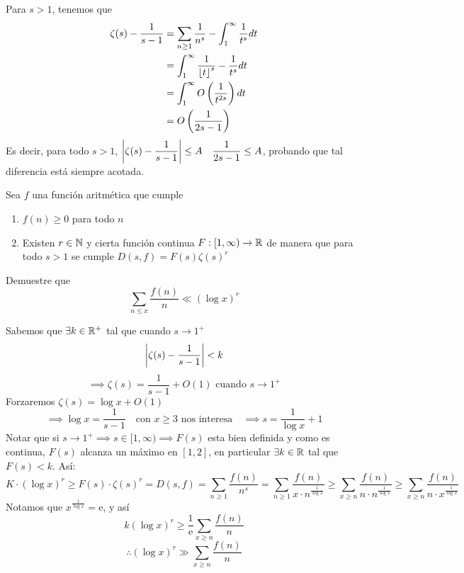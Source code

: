 \begin{sol}
    Para $s>1$, tenemos que
    \begin{align*}
        \zeta(s) - \dfrac{1}{s-1} &= \sum_{n \geq 1} \dfrac{1}{n^s} - \int_1^\infty \dfrac{1}{t^s} dt\\
        &= \int_1^\infty \dfrac{1}{\left\lfloor t\right\rfloor^s} - \dfrac{1}{t^s} dt\\
        &= \int_1^\infty O\left(\dfrac{1}{t^{2s}}\right) dt\\
        &= O\left(\dfrac{1}{2s-1}\right)
    \end{align*}
    Es decir, para todo $s>1$, $\left|\zeta(s) - \dfrac{1}{s-1}\right| \leq A\quad\dfrac{1}{2s-1} \leq A$, probando que tal diferencia está siempre acotada.
\end{sol}
\begin{prob}[2 pts.]
    Sea $f$ una función aritmética que cumple
    \begin{enumerate}[label = (\roman*)]
        \item  $f(n)\geq 0$ para todo $n$

        \item Existen $r\in\mathbb{N}$ y cierta función continua $F:[1,\infty)\xrightarrow[]{}\mathbb{R}$ de manera que para todo $s>1$ se cumple $D(s,f)=F(s)\zeta(s)^r$
    \end{enumerate}
    Demuestre que
    \[\sum_{n\leq x}\frac{f(n)}{n}\ll(\log x)^r\]
\end{prob}

\begin{sol}
    Sabemos que $\exists k\in\mathbb{R}^+$ tal que cuando $s\rightarrow1^+$
    \[\left|\zeta(s)-\frac{1}{s-1}\right|<k\]
    \[\displaystyle \implies \zeta(s)=\frac{1}{s-1}+O(1)\text{ cuando }s\rightarrow1^+\]
    Forzaremos $\zeta(s)=\log x+O(1)$
    \[\implies\log x=\frac{1}{s-1}\quad\text{con $x\geq3$ nos interesa}\quad\implies s=\frac{1}{\log x}+1\]
    Notar que si $s\rightarrow1^+\implies s\in[1,\infty)\implies F(s)$ esta bien definida y como es continua, $F(s)$ alcanza un máximo en $[1,2]$, en particular $\exists k\in\mathbb{R}$ tal que $F(s)<k$. Así:
    \[K\cdot(\log x)^r\geq F(s)\cdot\zeta(s)^r=D(s,f)=\sum_{n\geq 1}\frac{f(n)}{n^s}=\sum_{n\geq 1}\frac{f(n)}{x\cdot n^{\frac{1}{\log x}}}\geq\sum_{x\geq n}\frac{f(n)}{n\cdot n^{\frac{1}{\log x}}}\geq\sum_{x\geq n}\frac{f(n)}{n\cdot x^{\frac{1}{\log x}}}\]
    Notamos que $x^\frac{1}{\log x}=\mathrm{e}$, y así
    \[k(\log x)^r\geq \frac{1}{\mathrm{e}}\sum_{x\geq n}\frac{f(n)}{n}\]
    \[\therefore (\log x)^r\gg\sum_{x\geq n}\frac{f(n)}{n}\]
\end{sol}

